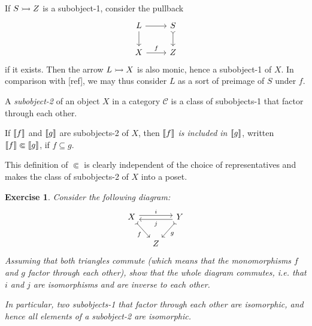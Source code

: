 \documentclass[article, a4paper, 11pt, oneside]{memoir}
\numberwithin{equation}{chapter}
\newcommand{\cat}[1]{\mathcal{#1}}
\newcommand{\catC}{\cat{C}}
\DeclarePairedDelimiter{\subobj}{\llbracket}{\rrbracket}
\theoremstyle{myexample}
\newtheorem{exercise}[theorem]{Exercise}
\theoremstyle{myexamplebreak}
\begin{document}
\begin{examplebreak}
\begin{enumexample}
        \item If $S \rightarrowtail Z$ is a subobject-1, consider the pullback
        \begin{equation*}
            \begin{tikzcd}
                L
                    \ar[r]
                    \ar[d]
                & S
                    \ar[d, tail]
                \\
                X
                    \ar[r, "f"]
                & Z
            \end{tikzcd}
        \end{equation*}
        if it exists. Then the arrow $L \rightarrowtail X$ is also monic, hence a subobject-1 of $X$. In comparison with [ref], we may thus consider $L$ as a sort of preimage of $S$ under $f$.
    \end{enumexample}
\end{examplebreak}


\begin{definition}
    A \emph{subobject-2} of an object $X$ in a category $\catC$ is a class of subobjects-1 that factor through each other.

    If $\subobj{f}$ and $\subobj{g}$ are subobjects-2 of $X$, then \emph{$\subobj{f}$ is included in $\subobj{g}$}, written $\subobj{f} \Subset \subobj{g}$, if $f \subseteq g$.
\end{definition}
%
This definition of $\Subset$ is clearly independent of the choice of representatives and makes the class of subobjects-2 of $X$ into a poset.



\begin{exercise}
    \label{exer:subobject_isomorphic}
    Consider the following diagram:
    \begin{equation*}
        \begin{tikzcd}[column sep=small]
            X
                \ar[rr, "i", shift left]
                \ar[dr, "f", tail, swap]
            && Y
                \ar[ll, "j", shift left]
                \ar[dl, "g", tail]
            \\
            & Z
        \end{tikzcd}
    \end{equation*}
    Assuming that both triangles commute (which means that the monomorphisms $f$ and $g$ factor through each other), show that the whole diagram commutes, i.e. that $i$ and $j$ are isomorphisms and are inverse to each other.

    In particular, two subobjects-1 that factor through each other are isomorphic, and hence all elements of a subobject-2 are isomorphic.
\end{exercise}
\end{document}
